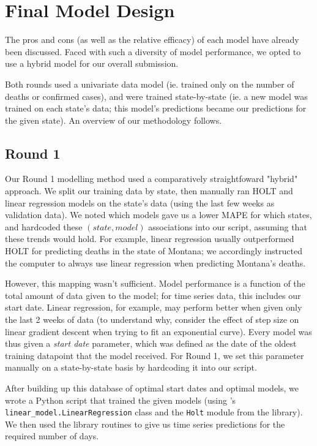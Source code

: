 \documentclass[sigconf,nonacm]{acmart}
\begin{document}
\section{Final Model Design}

The pros and cons (as well as the relative efficacy) of each model have already
been discussed. Faced with such a diversity of model performance, we opted to
use a hybrid model for our overall submission. 

Both rounds used a univariate data model (ie. trained only on the number of
deaths or confirmed cases), and were trained state-by-state (ie. a new model
was trained on each state's data; this model's predictions became our
predictions for the given state). An overview of our methodology follows. 

\subsection{Round 1}

Our Round 1 modelling method used a comparatively straightfoward "hybrid"
approach. We split our training data by state, then manually ran HOLT and
linear regression models on the state's data (using the last few weeks as
validation data). We noted which models gave us a lower MAPE for which states,
and hardcoded these $(state, model)$ associations into our script, assuming
that these trends would hold. For example, linear regression usually
outperformed HOLT for predicting deaths in the state of Montana; we accordingly
instructed the computer to always use linear regression when predicting
Montana's deaths. 

However, this mapping wasn't sufficient. 
Model performance is a function of the total amount of data given to the model;
for time series data, this includes our start date. Linear regression, for
example, may perform better when given only the last 2 weeks of data (to
understand why, consider the effect of step size on linear gradient descent
when trying to fit an exponential curve). 
Every model was thus given a \emph{start date} parameter, which was defined as
the date of the oldest training datapoint that the model received. 
For Round 1, we set this parameter manually on a state-by-state basis by
hardcoding it into our script. 

After building up this database of optimal start dates and optimal models, we
wrote a Python script that trained the given models (using \cite{scikit-learn}'s
\texttt{linear\_model.LinearRegression} class and the \texttt{Holt} module from
the \cite{statsmodels} library). We then used the library routines to give us
time series predictions for the required number of days. 
\end{document}
